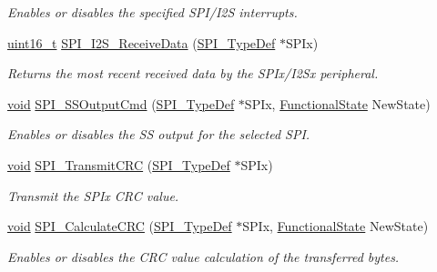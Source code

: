 \begin{DoxyCompactItemize}
\begin{DoxyCompactList}\small\item\em Enables or disables the specified S\+P\+I/\+I2S interrupts. \end{DoxyCompactList}\item 
\hyperlink{_p_e___types_8h_a1f1825b69244eb3ad2c7165ddc99c956}{uint16\+\_\+t} \hyperlink{group___s_p_i___exported___functions_gab77de76547f3bff403236b263b070a30}{S\+P\+I\+\_\+\+I2\+S\+\_\+\+Receive\+Data} (\hyperlink{struct_s_p_i___type_def}{S\+P\+I\+\_\+\+Type\+Def} $\ast$S\+P\+Ix)
\begin{DoxyCompactList}\small\item\em Returns the most recent received data by the S\+P\+Ix/\+I2\+Sx peripheral. \end{DoxyCompactList}\item 
\hyperlink{usb__devapi_8h_afabf60e7f57651d6d595a02c75f07cd0}{void} \hyperlink{group___s_p_i___exported___functions_ga4ec54abdedf6cd17403d853a926d91c1}{S\+P\+I\+\_\+\+S\+S\+Output\+Cmd} (\hyperlink{struct_s_p_i___type_def}{S\+P\+I\+\_\+\+Type\+Def} $\ast$S\+P\+Ix, \hyperlink{agilefox_2library_2inc_2stm32f10x__type_8h_ac9a7e9a35d2513ec15c3b537aaa4fba1}{Functional\+State} New\+State)
\begin{DoxyCompactList}\small\item\em Enables or disables the SS output for the selected S\+PI. \end{DoxyCompactList}\item 
\hyperlink{usb__devapi_8h_afabf60e7f57651d6d595a02c75f07cd0}{void} \hyperlink{group___s_p_i___exported___functions_gace8b1058e09bab150b0dbe5978810273}{S\+P\+I\+\_\+\+Transmit\+C\+RC} (\hyperlink{struct_s_p_i___type_def}{S\+P\+I\+\_\+\+Type\+Def} $\ast$S\+P\+Ix)
\begin{DoxyCompactList}\small\item\em Transmit the S\+P\+Ix C\+RC value. \end{DoxyCompactList}\item 
\hyperlink{usb__devapi_8h_afabf60e7f57651d6d595a02c75f07cd0}{void} \hyperlink{group___s_p_i___exported___functions_ga64f7276d119e6cb58afc100f8832adb0}{S\+P\+I\+\_\+\+Calculate\+C\+RC} (\hyperlink{struct_s_p_i___type_def}{S\+P\+I\+\_\+\+Type\+Def} $\ast$S\+P\+Ix, \hyperlink{agilefox_2library_2inc_2stm32f10x__type_8h_ac9a7e9a35d2513ec15c3b537aaa4fba1}{Functional\+State} New\+State)
\begin{DoxyCompactList}\small\item\em Enables or disables the C\+RC value calculation of the transferred bytes. \end{DoxyCompactList}\item 

\end{DoxyCompactItemize}
